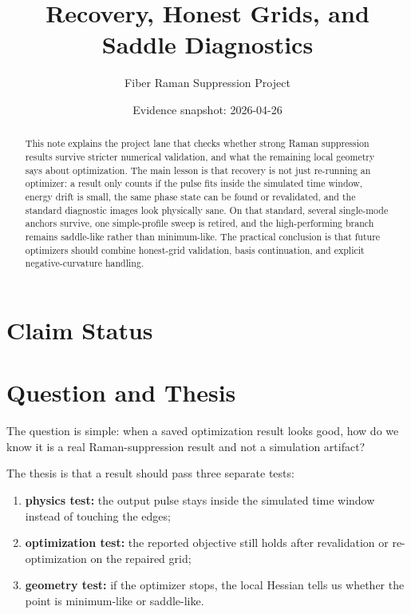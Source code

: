 \documentclass[11pt]{article}
\title{Recovery, Honest Grids, and Saddle Diagnostics}
\author{Fiber Raman Suppression Project}
\date{Evidence snapshot: 2026-04-26}
\begin{document}
\maketitle

\begin{abstract}
This note explains the project lane that checks whether strong Raman
suppression results survive stricter numerical validation, and what the
remaining local geometry says about optimization. The main lesson is that
recovery is not just re-running an optimizer: a result only counts if the pulse
fits inside the simulated time window, energy drift is small, the same phase
state can be found or revalidated, and the standard diagnostic images look
physically sane. On that standard, several single-mode anchors survive, one
simple-profile sweep is retired, and the high-performing branch remains
saddle-like rather than minimum-like. The practical conclusion is that future
optimizers should combine honest-grid validation, basis continuation, and
explicit negative-curvature handling.
\end{abstract}

\section*{Claim Status}

\section{Question and Thesis}

The question is simple: when a saved optimization result looks good, how do we
know it is a real Raman-suppression result and not a simulation artifact?

The thesis is that a result should pass three separate tests:
\begin{enumerate}
    \item \textbf{physics test:} the output pulse stays inside the simulated
    time window instead of touching the edges;
    \item \textbf{optimization test:} the reported objective still holds after
    revalidation or re-optimization on the repaired grid;
    \item \textbf{geometry test:} if the optimizer stops, the local Hessian
    tells us whether the point is minimum-like or saddle-like.
\end{enumerate}
\end{document}
